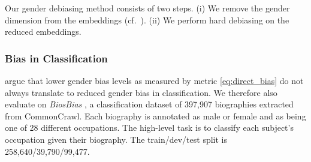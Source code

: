\documentclass[11pt,a4paper]{article}
\begin{document}




Our gender debiasing method consists of two steps.
(i) We remove the gender dimension from the embeddings
(cf.\ \citep{dufter19ultraDense}). (ii)
We perform hard debiasing
\citep{bolukbasi16debiasing} on the reduced
embeddings.


\subsubsection{Bias in Classification}

\citet{prost19biasTextClassif} argue that lower gender bias
levels as measured by metric  \eqref{eq:direct_bias}
do not always translate to reduced gender bias in
classification. We therefore also
evaluate on \textit{BiosBias} 
\citep{de19biosbias}, a classification dataset of 397,907 biographies
extracted from
CommonCrawl.
Each biography is annotated as male or female and as being
one
of 
28 different occupations. The high-level task is to
classify each subject's occupation given their
biography.
The train/dev/test split is 
258,640/39,790/99,477.
\end{document}
